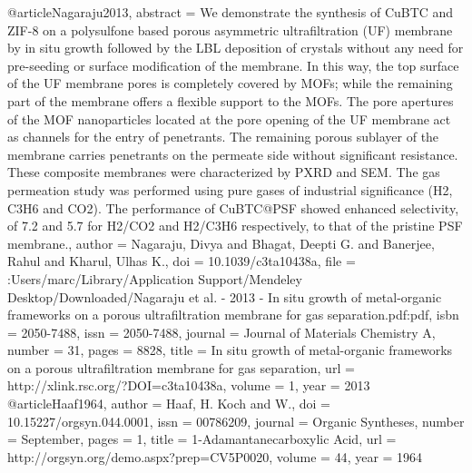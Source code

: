 @article{Nagaraju2013,
abstract = {We demonstrate the synthesis of CuBTC and ZIF-8 on a polysulfone based porous asymmetric ultrafiltration (UF) membrane by in situ growth followed by the LBL deposition of crystals without any need for pre-seeding or surface modification of the membrane. In this way, the top surface of the UF membrane pores is completely covered by MOFs; while the remaining part of the membrane offers a flexible support to the MOFs. The pore apertures of the MOF nanoparticles located at the pore opening of the UF membrane act as channels for the entry of penetrants. The remaining porous sublayer of the membrane carries penetrants on the permeate side without significant resistance. These composite membranes were characterized by PXRD and SEM. The gas permeation study was performed using pure gases of industrial significance (H2, C3H6 and CO2). The performance of CuBTC@PSF showed enhanced selectivity, of 7.2 and 5.7 for H2/CO2 and H2/C3H6 respectively, to that of the pristine PSF membrane.},
author = {Nagaraju, Divya and Bhagat, Deepti G. and Banerjee, Rahul and Kharul, Ulhas K.},
doi = {10.1039/c3ta10438a},
file = {:Users/marc/Library/Application Support/Mendeley Desktop/Downloaded/Nagaraju et al. - 2013 - In situ growth of metal-organic frameworks on a porous ultrafiltration membrane for gas separation.pdf:pdf},
isbn = {2050-7488},
issn = {2050-7488},
journal = {Journal of Materials Chemistry A},
number = {31},
pages = {8828},
title = {{In situ growth of metal-organic frameworks on a porous ultrafiltration membrane for gas separation}},
url = {http://xlink.rsc.org/?DOI=c3ta10438a},
volume = {1},
year = {2013}
}
@article{Haaf1964,
author = {Haaf, H. Koch and W.},
doi = {10.15227/orgsyn.044.0001},
issn = {00786209},
journal = {Organic Syntheses},
number = {September},
pages = {1},
title = {{1-Adamantanecarboxylic Acid}},
url = {http://orgsyn.org/demo.aspx?prep=CV5P0020},
volume = {44},
year = {1964}
}

